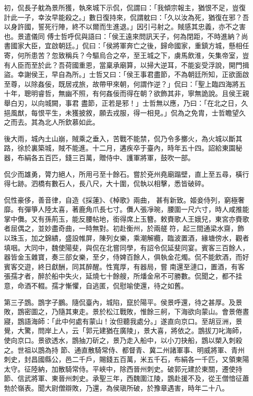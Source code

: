 \begin{pinyinscope}
 初，侃長子躭為景所獲，執來城下示侃，侃謂曰：「我傾宗報主，猶恨不足，豈復計此一子，幸汝早能殺之。」數日復持來，侃謂躭曰：「久以汝為死，猶復在邪？吾以身許國，誓死行陣，終不以爾而生進退。」因引弓射之。賊感其忠義，亦不之害也。景遣儀同
 傅士哲呼侃與語曰：「侯王遠來問訊天子，何為閉距，不時進納？尚書國家大臣，宜啟朝廷。」侃曰：「侯將軍奔亡之後，歸命國家，重鎮方城，懸相任寄，何所患苦？忽致稱兵？今驅烏合之卒，至王城之下，虜馬飲淮，矢集帝室，豈有人臣而至於此？吾荷國重恩，當稟承廟算，以掃大逆耳，不能妄受浮說，開門揖盜。幸謝侯王，早自為所。」士哲又曰：「侯王事君盡節，不為朝廷所知，正欲面啟至尊，以除姦佞，既居戎旅，故帶甲來朝，何謂作逆？」侃曰：「聖上臨四海將五十年，聰明睿哲，無幽不照，有何姦佞而得在朝？欲飾其非，寧無詭說。且侯王親舉白刃，以向城闕，事君
 盡節，正若是邪！」士哲無以應，乃曰：「在北之日，久挹風猷，每恨平生，未獲披敘，願去戎服，得一相見。」侃為之免胄，士哲瞻望久之而去。其為北人所欽慕如此。



 後大雨，城內土山崩，賊乘之垂入，苦戰不能禁，侃乃令多擲火，為火城以斷其路，徐於裏築城，賊不能進。十二月，遘疾卒于臺內，時年五十四。詔給東園秘器，布絹各五百匹，錢三百萬，贈侍中、護軍將軍，鼓吹一部。



 侃少而雄勇，膂力絕人，所用弓至十餘石。嘗於兗州堯廟蹋壁，直上至五尋，橫行得七跡。泗橋有數石人，長八尺，大十圍，侃執以相擊，悉皆破碎。



 侃性豪侈，善音律，自造《採蓮》、《棹歌》兩曲，
 甚有新致。姬妾侍列，窮極奢靡。有彈箏人陸太喜，著鹿角爪長七寸。儛人張凈琬，腰圍一尺六寸，時人咸推能掌中儛。又有孫荊玉，能反腰帖地，銜得席上玉簪。敕賚歌人王娥兒，東宮亦賚歌者屈偶之，並妙盡奇曲，一時無對。初赴衡州，於兩艖符，起三間通梁水齋，飾以珠玉，加之錦繢，盛設帷屏，陳列女樂，乘潮解纜，臨波置酒，緣塘傍水，觀者填咽。大同中，魏使陽斐，與侃在北嘗同學，有詔令侃延斐同宴。賓客三百餘人，器皆金玉雜寶，奏三部女樂，至夕，侍婢百餘人，俱執金花燭。侃不能飲酒，而好賓客交遊，終日獻酬，同其醉醒。性寬厚，有器局，嘗
 南還至漣口，置酒，有客張孺才者，醉於船中失火，延燒七十餘艘，所燔金帛不可勝數。侃聞之，都不挂意，命酒不輟。孺才慚懼，自逃匿，侃慰喻使還，待之如舊。



 第三子鵾。鵾字子鵬。隨侃臺內，城陷，竄於陽平。侯景呼還，待之甚厚。及景敗，鵾密圖之，乃隨其東走。景於松江戰敗，惟餘三舸，下海欲向蒙山。會景倦晝寢，鵾語海師：「此中何處有蒙山！汝但聽我處分。」遂直向京口。至胡豆洲，景覺，大驚，問岸上人，云「郭元建猶在廣陵」，景大喜，將依之。鵾拔刀叱海師，使向京口。景欲透水，鵾抽刀斫之，景乃走入船中，以小刀抉船，鵾以槊入刺殺之。世祖以鵾為持
 節、通直散騎常侍、都督青、冀二州諸軍事、明威將軍、青州刺史，封昌國縣公，邑二千戶，賜錢五百萬，米五千石，布絹各一千匹，又領東陽太守。征陸納，加散騎常侍。平峽中，除西晉州刺史。破郭元建於東關，遷使持節、信武將軍、東晉州刺史。承聖三年，西魏圍江陵，鵾赴援不及，從王僧愔征蕭勃於嶺表。聞大尉僧辯敗，乃還，為侯瑱所破，於豫章遇害，時年二十八。




\end{pinyinscope}
